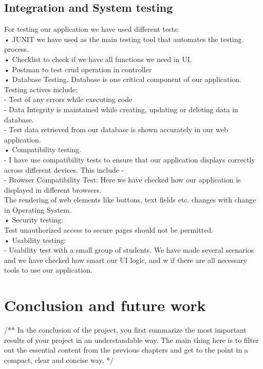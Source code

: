 \documentclass{scrartcl}
\begin{document}
\subsection{Integration and System testing}
For testing  our application we have used different tests:\\
• JUNIT we have used as the main testing tool that automates the testing.\\ process.\\
• Checklist to check if we have all functions we need in UI.\\
• Postman to test crud operation in controller\\
• Database Testing. Database is one critical component of our application. Testing actives include:\\
 - Test of any errors while executing code\\
 - Data Integrity is maintained while creating, updating or deleting data in database.\\
 - Test data retrieved from our database is shown accurately in our web application.\\
• Compatibility testing.\\
 - I have use compatibility tests to ensure that our application displays correctly across different devices. This include -\\
 - Browser Compatibility Test: Here we have checked how our application is displayed in different browsers.\\
   The rendering of web elements like buttons, text fields etc. changes with change in Operating System.\\
• Security testing: \\
   Test unauthorized access to secure pages should not be permitted.\\
• Usability testing:\\
  -  Usability test with a small group of students. We have made several scenarios and we have checked how smart our UI logic, and w if there are all necessary tools to use our application.\\



\section{Conclusion and future work}
/**
 In the conclusion of the project, you first summarize the most important results of your project in an understandable way. The main thing here is to filter out the essential content from the previous chapters and get to the point in a compact, clear and concise way.
*/
\end{document}
